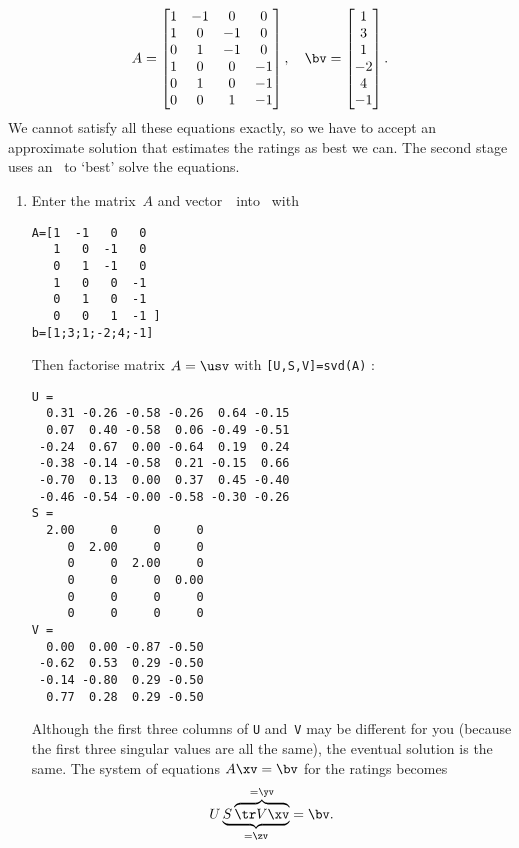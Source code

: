 \begin{example}
\begin{solution}
\begin{equation*}
A=\begin{bmatrix}    1 & -1 & 0 & 0
\\ 1 & 0 & -1 & 0
\\ 0 & 1 & -1 & 0
\\ 1 & 0 & 0 & -1
\\ 0 & 1 & 0 & -1
\\ 0 & 0 & 1 & -1
 \end{bmatrix},\quad
 \bv=\begin{bmatrix} 1\\ 3\\ 1\\ -2\\ 4\\ -1 \end{bmatrix}.
\end{equation*}
We cannot satisfy all these equations exactly, so we have to accept an approximate solution that estimates the ratings as best we can.
The second stage uses an \svd\ to `best' solve the equations.
\begin{enumerate}
\item Enter the matrix~\(A\) and vector~\bv\ into \script\ with
\setbox\ajrqrbox\hbox{}%
\marginpar{\usebox{\ajrqrbox\\[2ex]}}%
\begin{verbatim}
A=[1  -1   0   0
   1   0  -1   0
   0   1  -1   0
   1   0   0  -1
   0   1   0  -1
   0   0   1  -1 ]
b=[1;3;1;-2;4;-1]
\end{verbatim}
Then factorise  matrix \(A=\usv\) with \verb|[U,S,V]=svd(A)| \twodp:
\begin{verbatim}
U =
  0.31 -0.26 -0.58 -0.26  0.64 -0.15
  0.07  0.40 -0.58  0.06 -0.49 -0.51
 -0.24  0.67  0.00 -0.64  0.19  0.24
 -0.38 -0.14 -0.58  0.21 -0.15  0.66
 -0.70  0.13  0.00  0.37  0.45 -0.40
 -0.46 -0.54 -0.00 -0.58 -0.30 -0.26
S =
  2.00     0     0     0
     0  2.00     0     0
     0     0  2.00     0
     0     0     0  0.00
     0     0     0     0
     0     0     0     0
V =
  0.00  0.00 -0.87 -0.50
 -0.62  0.53  0.29 -0.50
 -0.14 -0.80  0.29 -0.50
  0.77  0.28  0.29 -0.50
\end{verbatim}
Although the first three columns of \verb|U| and~\verb|V| may be different for you (because the first three singular values are all the same),  the eventual solution is the same.
The system of equations \(A\xv=\bv\) for the ratings becomes
\begin{equation*}
U\underbrace{S\overbrace{\tr V\xv}^{=\yv}}_{=\zv}
=\bv.
\end{equation*}


\end{enumerate}
\end{solution}
\end{example}
